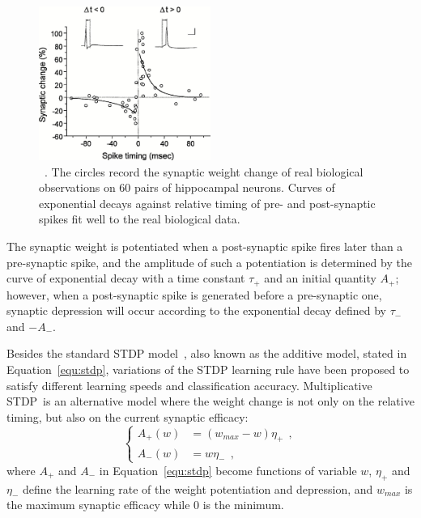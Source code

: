 \begin{figure}[bt!]
	\centering
	\includegraphics[width=0.5\textwidth]{pics_snn/stdp.jpeg}
	\caption{\DIFdelbeginFL {}\DIFdelendFL \DIFaddbeginFL {}\DIFaddendFL ~\DIFdelbeginFL {}\DIFdelendFL {}\DIFaddendFL .
	The circles record the synaptic weight change of real biological observations on 60 pairs of hippocampal neurons.
	Curves of exponential decays against relative timing of pre- and post-synaptic spikes fit well to the real biological data.
	}
	\label{Fig:STDP}
\end{figure}

The synaptic weight is potentiated when a post-synaptic spike fires later than a pre-synaptic spike, and the amplitude of such a potentiation is determined by the curve of exponential decay with a time constant $\tau_+$ and an initial quantity $A_+$;
however, when a post-synaptic spike is generated before a pre-synaptic one, synaptic depression will occur according to the exponential decay defined by $\tau_-$ and $-A_-$.

Besides the standard STDP model~\DIFdelbegin {}\DIFdelend \DIFaddbegin {}\DIFaddend , also known as the additive model, stated in Equation~\ref{equ:stdp}, variations of the STDP learning rule have been proposed to satisfy different learning speeds and classification accuracy.
Multiplicative STDP~\DIFdelbegin {}\DIFdelend \DIFaddbegin {}\DIFaddend is an alternative model where the weight change is not only \DIFdelbegin {}\DIFdelend \DIFaddbegin {}\DIFaddend on the relative timing, but also on the current synaptic efficacy:
\begin{equation}
\left\{
\begin{aligned}
A_+ (w) &=  (w_{max} - w)\eta_+~~, \\
A_- (w) &= w\eta_-~~,
\end{aligned}
\right.
\end{equation}
where $A_+$ and $A_-$ in Equation~\ref{equ:stdp} become functions of variable 
$w$, $\eta_+$ and $\eta_-$ define the learning rate of the weight potentiation and depression, and $w_{max}$ is the maximum synaptic efficacy while 0 is the minimum.

